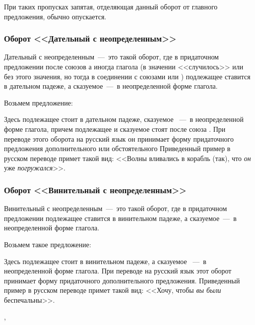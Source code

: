 \documentclass[11pt,a4paper,oneside]{memoir}
\begin{document}
    При таких пропусках запятая, отделяющая данный оборот от главного предложения, обычно опускается.

                \subsubsection{Оборот <<Дательный с неопределенным>>}

    Дательный с неопределенным~---~это такой оборот, где в придаточном предложении после союзов {\slv{}} а иногда глагола {\slv{}} (в значении <<случилось>> или без этого значения, но тогда в соединении с союзами {\slv{}} или {\slv{}}) подлежащее ставится в дательном падеже, а сказуемое~---~в неопределенной форме глагола.
    
    Возьмем предложение:
    
    \bigskip{}

    Здесь подлежащее {} стоит в дательном падеже, сказуемое {}~---~в неопределенной форме глагола, причем подлежащее и сказуемое стоят после союза {}. При переводе этого оборота на русский язык он принимает форму придаточного предложения дополнительного или обстоятельного Приведенный пример в русском переводе примет такой вид: <<Волны вливались в корабль (так), что \emph{он} уже \emph{погружался}>>.
    
                \subsubsection{Оборот <<Винительный с неопределенным>>}

    Винительный с неопределенным~---~это такой оборот, где в придаточном предложении подлежащее ставится в винительном падеже, а сказуемое~---~в неопределенной форме глагола.
    
    Возьмем такое предложение:
    
    \bigskip{}
    
    Здесь подлежащее {\slv{}} стоит в винительном падеже, а сказуемое {\slv{}}~---~в неопределенной форме глагола. При переводе на русский язык этот оборот принимает форму придаточного дополнительного предложения. Приведенный пример в русском переводе примет такой вид: <<Хочу, чтобы \emph{вы были} беспечальны>>.
    
    \begin{flushright}
        {\tiny{}, \DTMnow}
    \end{flushright}
\end{document}

